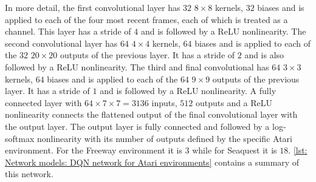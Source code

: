 In more detail, the first convolutional layer has $32$ $8\times8$ kernels, $32$ biases and is applied to each of the four most recent frames, each of which is treated as a channel. This layer has a stride of $4$ and is followed by a ReLU nonlinearity. The second convolutional layer has $64$ $4\times4$ kernels, $64$ biases and is applied to each of the $32$ $20\times20$ outputs of the previous layer. It has a stride of $2$ and is also followed by a ReLU nonlinearity. The third and final convolutional has $64$ $3\times3$ kernels, $64$ biases and is applied to each of the $64$ $9\times9$ outputs of the previous layer. It has a stride of $1$ and is followed by a ReLU nonlinearity. A fully connected layer with $64\times7\times7=3136$ inputs, $512$ outputs and a ReLU nonlinearity connects the flattened output of the final convolutional layer with the output layer. The output layer is fully connected and followed by a log-softmax nonlinearity with its number of outputs defined by the specific Atari environment. For the Freeway environment it is $3$ while for Seaquest it is $18$. \autoref{lst: Network models: DQN network for Atari environments} contains a summary of this network.





